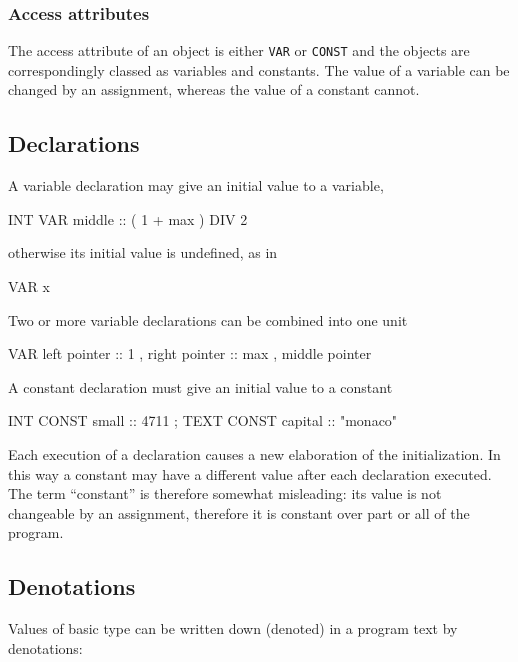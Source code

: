 \subsubsection{Access attributes}

The access attribute of an object is either {\tt VAR} or {\tt CONST}
and the objects are correspondingly classed as variables
and constants. The value of a variable can be changed by an assignment,
whereas the value of a constant cannot.

\subsection{Declarations}

A variable declaration may give an initial value to a variable,

\begin{elan}
        INT VAR middle :: ( 1 + max ) DIV 2
\end{elan}

\noindent
otherwise its initial value is undefined, as in

\begin{elan}
        VAR x
\end{elan}

\noindent
Two or more variable declarations can be combined into one unit

\begin{elan}
        VAR left pointer :: 1 ,
            right pointer :: max ,
            middle pointer
\end{elan}

\noindent
A constant declaration must give an initial value to a constant

\begin{elan}
        INT CONST small :: 4711 ;
        TEXT CONST capital :: "monaco"
\end{elan}

\noindent
Each execution of a declaration causes a new elaboration of the
initialization. In this way a constant may have a different value
after each declaration executed. The term ``constant'' is therefore
somewhat misleading: its value is not changeable by an assignment,
therefore it is constant over part or all of the program.

\subsection{Denotations}

Values of basic type can be written down (denoted) in a program
text by denotations:

